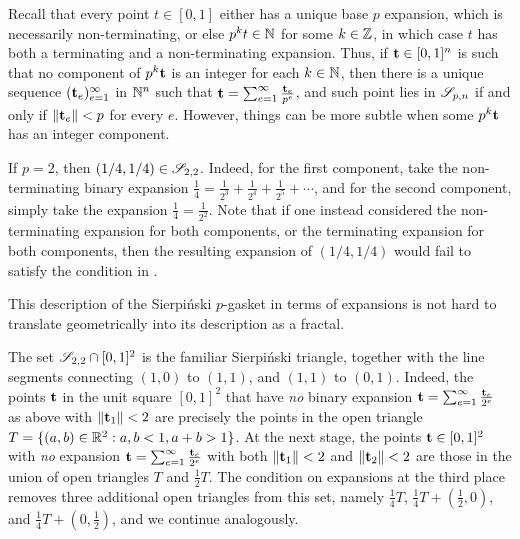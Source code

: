 \documentclass{amsart}
\begin{document}
Recall that every point $t \in [0,1]$ either has a unique base $p$ expansion, which is necessarily non-terminating, or else $p^k t \in \mathbb{N}$ for some $k \in \mathbb{Z}$, in which case $t$ has both a terminating and a non-terminating expansion.
Thus, if $\mathbf{t} \in [0,1]^n$ is such that no component of $p^k \mathbf{t}$ is an integer for each $k \in \mathbb{N}$, then there is a unique sequence $( \mathbf{t}_e )_{e=1}^{\infty}$ in $ \mathbb{N}^n$ such that $\mathbf{t} = \sum_{e=1}^{\infty} \frac{\mathbf{t}_e}{p^e}$, and such point lies in ${\mathscr{S}}_{p,n}$ if and only if $\| \mathbf{t}_e \| < p$ for every  $e$.
However, things can be more subtle when some $p^k \mathbf{t}$ has an integer component.

\begin{example}
If $p=2$, then $(1/4, 1/4) \in \mathscr{S}_{2,2}$.  Indeed, for the first component, take the non-terminating binary expansion $\frac{1}{4} = \frac{1}{2^3} + \frac{1}{2^4} + \frac{1}{2^5} + \cdots$, and for the second component, simply take the expansion $\frac{1}{4} = \frac{1}{2^2}$.  Note that if one instead considered the non-terminating expansion for both components, or the terminating expansion for both components, then the resulting expansion of $(1/4, 1/4)$ would fail to satisfy the condition in .
\end{example}

This description of the Sierpi\'nski $p$-gasket in terms of expansions is not hard to translate geometrically into its description as a fractal.

\begin{example}
\label{sierpinski triangle: E}
The set $\mathscr{S}_{2,2} \cap [0,1]^2$ is the familiar Sierpi\'nski triangle, together with the line segments connecting $(1,0)$ to $(1,1)$, and $(1,1)$ to $(0,1)$.
Indeed, the points $\mathbf{t}$ in the unit square $[0,1]^2$ that have \emph{no} binary expansion $\mathbf{t} = \sum_{e=1}^{\infty}\frac{\mathbf{t}_e}{2^e}$ as above with $\| \mathbf{t}_1 \| < 2$ are precisely the points in the open triangle  $T = \{ (a,b) \in \mathbb{R}^2 : a,b < 1, a+b > 1 \}$.
At the next stage, the points $\mathbf{t} \in [0,1]^2$ with \emph{no} expansion $\mathbf{t} = \sum_{e=1}^{\infty}\frac{\mathbf{t}_e}{2^e}$ with both  $\| \mathbf{t}_1 \| < 2$ and $\| \mathbf{t}_2 \| < 2$ are those in the union of open triangles $T$ and $\frac{1}{2} T$.  The condition on expansions at the third place removes three additional open triangles from this set, namely $\frac14 T$, $\frac14 T + (\frac12,0)$, and $\frac14 T + (0,\frac12)$, and we continue analogously.
\end{example}
\end{document}
